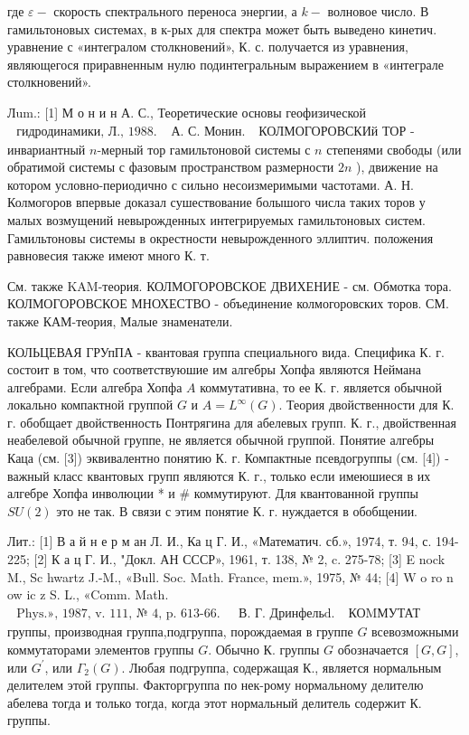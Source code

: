 \documentclass[10pt]{article}
\begin{document}
где $\varepsilon-$ скорость спектрального переноса энергии, а $k-$ волновое число. В гамильтоновых системах, в к-рых для спектра может быть выведено кинетич. уравнение с «интегралом столкновений», К. с. получается из уравнения, являющегося приравненным нулю подинтегральным выражением в «интеграле столкновений».



Лum.: [1] М о н и н А. С., Теоретические основы геофизической $\begin{array}{ll}\text { гидродинамики, Л., } 1988 . & \text { А. С. Монин. }\end{array}$ КОЛМОГОРОВСКИй ТОР - инвариантный $n$-мерный тор гамильтоновой системы с $n$ степенями свободы (или обратимой системы с фазовым пространством размерности $2 n$ ), движение на котором условно-периодично с сильно несоизмеримыми частотами. А. Н. Колмогоров впервые доказал сушествование болышого числа таких торов у малых возмущений невырожденных интегрируемых гамильтоновых систем. Гамильтоновы системы в окрестности невырожденного эллиптич. положения равновесия также имеют много К. т.



См. также KAM-теория. КОЛМОГОРОВСКОЕ ДВИХЕНИЕ - см. Обмотка тора. КОЛМОГОРОВСКОЕ МНОХЕСТВО - объединение колмогоровских торов. СМ. также КАМ-теория, Малые знаменатели.



КОЛЬЦЕВАЯ ГРУпПА - квантовая группа специального вида. Специфика К. г. состоит в том, что соответствуюшие им алгебры Хопфа являются Неймана алгебрами. Если алгебра Хопфа $A$ коммутативна, то ее К. г. является обычной локально компактной группой $G$ и $A=L^{\infty}(G)$. Теория двойственности для К. г. обобщает двойственность Понтрягина для абелевых групп. К. г., двойственная неабелевой обычной группе, не является обычной группой. Понятие алгебры Каца (см. [3]) эквивалентно понятию К. г. Компактные псевдогруппы (см. [4]) - важный класс квантовых групп являются К. г., только если имеюшиеся в их алгебре Хопфа инволюции * и \# коммутируют. Для квантованной группы $S U(2)$ это не так. В связи с этим понятие К. г. нуждается в обобщении.



Лит.: [1] В а й н е р м ан Л. И., Ка ц Г. И., «Математич. сб.», 1974, т. 94, с. 194-225; [2] К а ц Г. И., "Докл. АН СССР», 1961, т. 138, № 2, c. 275-78; [3] E nock M., Sc hwartz J.-M., «Bull. Soc. Math. France, mem.», 1975, № 44; [4] W o ro n ow ic z S. L., «Comm. Math. $\begin{array}{ll}\text { Phys.», 1987, v. 111, № 4, p. 613-66. } & \text { В. Г. Дринфельd. }\end{array}$ КОMМУТАТ группы, производная группа,подгруппа, порождаемая в группе $G$ всевозможными коммутаторами элементов группы $G$. Обычно К. группы $G$ обозначается $[G, G]$, или $G^{\prime}$, или $\Gamma_{2}(G)$. Любая подгруппа, содержащая К., является нормальным делителем этой группы. Факторгруппа по нек-рому нормальному делителю абелева тогда и только тогда, когда этот нормальный делитель содержит К. группы.
\end{document}
